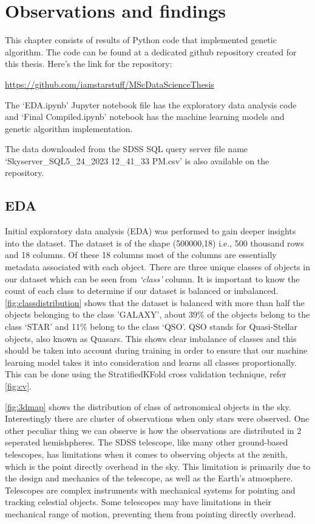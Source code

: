 \chapter{Observations and findings}
This chapter consists of results of Python code that implemented genetic algorithm. The code can be found at a dedicated github repository \citep{github} created for this thesis. Here's the link for the repository:

\url{https://github.com/iamstarstuff/MScDataScienceThesis}

The `EDA.ipynb' Jupyter notebook file has the exploratory data analysis code and `Final Compiled.ipynb' notebook has the machine learning models and genetic algorithm implementation.

The data downloaded from the SDSS SQL query server file name `Skyserver\_SQL5\_24\_2023 12\_41\_33 PM.csv' is also available on the repository.

\section{EDA}

Initial exploratory data analysis (EDA) was performed to gain deeper insights into the dataset. The dataset is of the shape (500000,18) i.e., 500 thousand rows and 18 columns. Of these 18 columns most of the columns are essentially metadata associated with each object. There are three unique classes of objects in our dataset which can be seen from \textit{`class'} column. It is important to know the count of each class to determine if our dataset is balanced or imbalanced. \autoref{fig:classdistribution} shows that the dataset is balanced with more than half the objects belonging to the class 'GALAXY', about 39\% of the objects belong to the class `STAR' and 11\% belong to the class `QSO'. QSO stands for Quasi-Stellar objects, also known as Quasars. This shows clear imbalance of classes and this should be taken into account during training in order to ensure that our machine learning model takes it into consideration and learns all classes proportionally. This can be done using the StratifiedKFold cross validation technique, refer \autoref{fig:cv}.

\autoref{fig:3dmap} shows the distribution of class of astronomical objects in the sky. Interestingly there are cluster of observations when only stars were observed. One other peculiar thing we can observe is how the observations are distributed in 2 seperated hemishpheres. The SDSS telescope, like many other ground-based telescopes, has limitations when it comes to observing objects at the zenith, which is the point directly overhead in the sky. This limitation is primarily due to the design and mechanics of the telescope, as well as the Earth's atmosphere. Telescopes are complex instruments with mechanical systems for pointing and tracking celestial objects. Some telescopes may have limitations in their mechanical range of motion, preventing them from pointing directly overhead.

